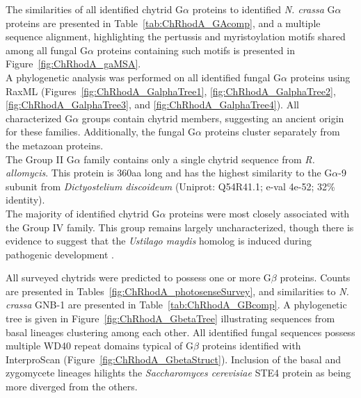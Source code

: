 \indent The similarities of all identified chytrid G$\alpha$ proteins to identified \textit{N. crassa} G$\alpha$ proteins are presented in Table~\ref{tab:ChRhodA_GAcomp}, and a multiple sequence alignment, highlighting the pertussis and myristoylation motifs shared among all fungal G$\alpha$ proteins containing such motifs is presented in Figure~\ref{fig:ChRhodA_gaMSA}.\\
\indent A phylogenetic analysis was performed on all identified fungal G$\alpha$ proteins using RaxML (Figures~\ref{fig:ChRhodA_GalphaTree1}, \ref{fig:ChRhodA_GalphaTree2}, \ref{fig:ChRhodA_GalphaTree3}, and \ref{fig:ChRhodA_GalphaTree4}). All characterized G$\alpha$ groups contain chytrid members, suggesting an ancient origin for these families. Additionally, the fungal G$\alpha$ proteins cluster separately from the metazoan proteins.\\
The Group II G$\alpha$ family contains only a single chytrid sequence from \textit{R. allomycis}. This protein is 360aa long and has the highest similarity to the G$\alpha$-9 subunit from \textit{Dictyostelium discoideum} (Uniprot: Q54R41.1; e-val 4e-52; 32\% identity).\\
The majority of identified chytrid G$\alpha$ proteins were most closely associated with the Group IV family. This group remains largely uncharacterized, though there is evidence to suggest that the \textit{Ustilago maydis} homolog is induced during pathogenic development \cite{Bolker1998}. 

\indent All surveyed chytrids were predicted to possess one or more G$\beta$ proteins. Counts are presented in Tables~\ref{fig:ChRhodA_photosenseSurvey}, and similarities to \textit{N. crassa} GNB-1 are presented in Table~\ref{tab:ChRhodA_GBcomp}. A phylogenetic
tree is given in Figure~\ref{fig:ChRhodA_GbetaTree} illustrating sequences from basal lineages clustering among each other. All identified fungal sequences possess multiple WD40 repeat domains typical of G$\beta$ proteins identified with InterproScan (Figure~\ref{fig:ChRhodA_GbetaStruct}). Inclusion of the basal and zygomycete lineages hilights the \textit{Saccharomyces cerevisiae} STE4 protein as being more diverged from the others.\\


